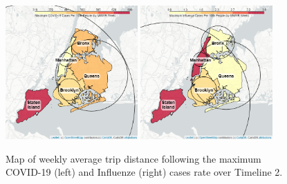 \documentclass[11pt]{article}
\begin{document}




    \begin{figure}[H]

        \centering
    
        \includegraphics[width=0.45\textwidth]{../plots/map-avg-trip-distance-at-max-covid-by-pu_borough-MODIFIED.png}
        \includegraphics[width=0.45\textwidth]{../plots/map-avg-trip-distance-at-max-flu-by-pu_borough-MODIFIED.png}

        \caption{Map of weekly average trip distance following the maximum COVID-19 (left) and Influenze (right) cases rate over Timeline 2.} %
        \label{maps}
    \end{figure}
    
\end{document}
